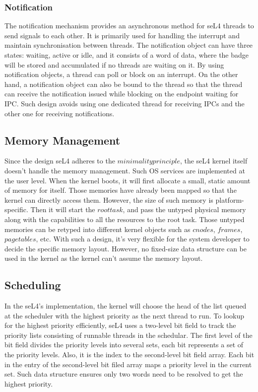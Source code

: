 \subsubsection{Notification}

The notification mechanism provides an asynchronous method for seL4 threads to send signals to each other. It is primarily used for handling the interrupt and maintain synchronisation between threads. The notification object can have three states: waiting, active or idle, and it consists of a word of data, where the badge will be stored and accumulated if no threads are waiting on it. By using notification objects, a thread can poll or block on an interrupt. On the other hand, a notification object can also be bound to the thread so that the thread can receive the notification issued while blocking on the endpoint waiting for IPC. Such design avoids using one dedicated thread for receiving IPCs and the other one for receiving notifications.

\subsection{Memory Management}

Since the design seL4 adheres to the $minimality principle$, the seL4 kernel itself doesn't handle the memory management. Such OS services are implemented at the user level. When the kernel boots, it will first allocate a small, static amount of memory for itself. Those memories have already been mapped so that the kernel can directly access them. However, the size of such memory is platform-specific. Then it will start the $root task$, and pass the untyped physical memory along with the capabilities to all the resources to the root task. Those untyped memories can be retyped into different kernel objects such as $cnodes$, $frames$, $page tables$, etc. With such a design, it's very flexible for the system developer to decide the specific memory layout. However, no fixed-size data structure can be used in the kernel as the kernel can't assume the memory layout.

\subsection{Scheduling}

In the seL4's implementation, the kernel will choose the head of the list queued at the scheduler with the highest priority as the next thread to run. To lookup for the highest priority efficiently, seL4 uses a two-level bit field to track the priority lists consisting of runnable threads in the schedular. The first level of the bit field divides the priority levels into several sets, each bit represents a set of the priority levels. Also, it is the index to the second-level bit field array. Each bit in the entry of the second-level bit filed array maps a priority level in the current set. Such data structure ensures only two words need to be resolved to get the highest priority.

